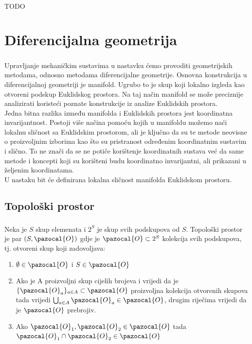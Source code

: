 \documentclass[times, utf8, diplomski]{fer}
\newcommand{\Oa}{\pazocal{O}}
\begin{document}
\paragraph{}
TODO

\newpage 
\clearpage

\chapter{Diferencijalna geometrija}

	\paragraph{} Upravljanje mehaničkim sustavima u nastavku ćemo provoditi geometrijskih metodama, odnosno metodama diferencijalne geometrije. Osnovna konstrukcija u diferencijalnoj geometriji je manifold. Ugrubo to je skup koji lokalno izgleda kao otvoreni podskup Euklidskog prostora. Na taj način manifold se može preciznije analizirati koristeći poznate konstrukcije iz analize Euklidskih prostora. \\ 
	Jedna bitna razlika između manifolda i Euklidskih prostora jest koordinatna invarijantnost. Postoji više načina pomoću kojih u manifoldu možemo naći lokalnu sličnost sa Euklidskim prostorom, ali je ključno da su te metode neovisne o proizvoljnim izborima kao što su pristranost određenim koordinatnim sustavim i slično. To ne znači da se ne potiče korištenje koordinatnih sustava već da same metode i koncepti koji su korišteni budu koordinatno invarijantni, ali prikazani u željenim koordinatama. \\
	U nastaku bit će definirana lokalna sličnost manifolda Euklidskom prostoru.

\section{Topološki prostor}
	
	\paragraph{}Neka je $S$ skup elemenata i $2^S$ je skup svih podskupova od $S$. Topološki prostor je par $(S, \Oa)$ gdje je $\Oa\subset2^S$ kolekcija svih podskupova, tj. otvoreni skup koji zadovoljava:
	\begin{enumerate}
		\item $\emptyset \in \Oa$ i $S \in \Oa$ 
		
		\item Ako je A proizvoljni skup cijelih brojeva i vrijedi da je $\{ \Oa_{a} \}_{a\in A}\subset \Oa$ proizvoljna kolekcija otvorenih skupova tada vrijedi $\bigcup_{a\in A}\Oa_a\in \Oa$, drugim riječima vrijedi da je $\Oa$ prebrojiv.
		
		\item Ako $\Oa_1, \Oa_2 \in \Oa$ tada $\Oa_1 \cap \Oa_2 \in \Oa$
	\end{enumerate}
\end{document}
